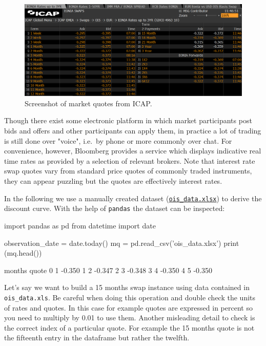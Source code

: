 \begin{figure}[bth]
  \centering
\includegraphics[width=1.\linewidth]{figures/icap_3.png}
\caption{Screenshot of market quotes from ICAP.}
\label{fig:icap}
\end{figure}

Though there exist some electronic platform in which market participants post bids and offers and other participants can apply them, in practice a lot of trading is still done over "voice", i.e.~by phone or more commonly over chat. For convenience, however, Bloomberg provides a service which displays indicative real time rates as provided by a selection of relevant brokers. Note that interest rate swap quotes vary from standard price quotes of commonly traded instruments, they can appear puzzling but the quotes are effectively interest rates.

In the following we use a manually created dataset (\href{https://github.com/matteosan1/finance_course/raw/develop/libro/input_files/ois_data.xlsx'}{\texttt{ois\_data.xlsx}}) to derive the discount curve. With the help of \texttt{pandas} the dataset can be inspected:

\begin{ipython}
import pandas as pd
from datetime import date

observation_date = date.today()
mq = pd.read_csv('ois_data.xlsx')
print (mq.head())
\end{ipython}
\begin{ioutput}
   months  quote
0       1 -0.350
1       2 -0.347
2       3 -0.348
3       4 -0.350
4       5 -0.350
\end{ioutput}

Let's say we want to build a 15 months swap instance using data contained in \texttt{ois\_data.xls}. Be careful when doing this
operation and double check the units of rates and quotes. In this case for example quotes are expressed in percent so you need to multiply by 0.01 to use them. Another misleading detail to check is the correct index of a particular quote. For example the 15 months quote is not the fifteenth entry in the dataframe but rather the twelfth.

